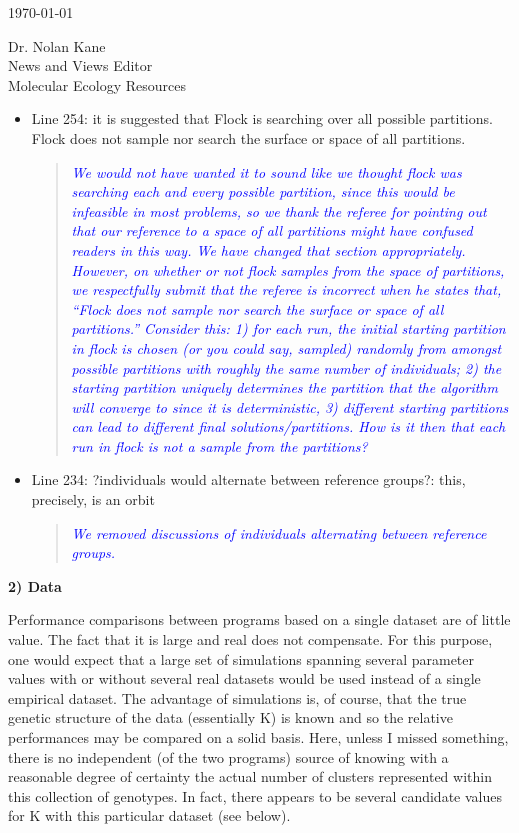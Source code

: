 \documentclass[11pt]{letter}
\newcommand{\reply}[1]{\begin{quotation}\small\sl\textcolor{blue}{#1}\end{quotation}}
\begin{document}
\begin{letter}{ \today 

Dr. Nolan Kane\\
News and Views Editor\\
Molecular Ecology Resources \\
}
\begin{itemize}
\item Line 254: it is suggested that Flock is searching over all possible partitions. Flock does not sample nor search the surface or space of all partitions.
\reply{We would not have wanted it to sound like we thought {\sc flock} was searching
each and every possible
partition, since this would be infeasible in most problems, so we thank the referee for pointing out that our reference to a space of all partitions might
have confused readers in this way.  We have changed that section appropriately.  However, on whether
or not {\sc flock} samples from the space of partitions, we respectfully submit that the referee is
incorrect when he states that, ``Flock does not sample nor search the surface or space of all partitions.'' 
Consider this: 1) for each run, the initial starting partition in {\sc flock} is chosen (or you could say,
sampled) randomly from amongst
possible partitions with roughly the same number of individuals; 2) the starting partition uniquely
determines the partition that the algorithm will converge to since it is deterministic, 3) different
starting partitions can lead to different final solutions/partitions.  How is it then that each
run in {\sc flock} is {\em not} a sample from the partitions?  }
\item Line 234: ?individuals would alternate between reference groups?: this, precisely, is an orbit
\reply{We removed discussions of individuals alternating between reference groups.}
\end{itemize}

{\bf 2) Data}

Performance comparisons between programs based on a single dataset are of little value. The fact that it is large and real does not compensate. For this purpose, one would expect that a large set of simulations spanning several parameter values with or without several real datasets would be used instead of a single empirical dataset. The advantage of simulations is, of course, that the true genetic structure of the data (essentially K) is known and so the relative performances may be compared on a solid basis. Here, unless I missed something, there is no independent (of the two programs) source of knowing with a reasonable degree of certainty the actual number of clusters represented within this collection of genotypes. In fact, there appears to be several candidate values for K with this particular dataset (see below).


\end{letter}
\end{document}
